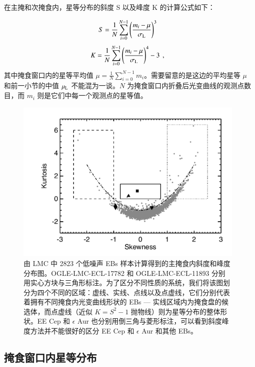 在主掩和次掩食内，星等分布的斜度 S 以及峰度 K 的计算公式如下：

\begin{equation} \label{eq:skew}
S =  \frac{1}{N} \sum_{i=0}^{N-1} \left(\frac{m_i - \mu}{\sigma_\mathrm{L}}\right)^3 
\end{equation} %
\begin{equation} \label{eq:kur}
K =  \frac{1}{N} \sum_{i=0}^{N-1} \left(\frac{m_i - \mu}{\sigma_\mathrm{L}}\right)^4 - 3 \, \ , 
\end{equation} %
其中掩食窗口内的星等平均值 $\mu = \frac{1}{N} \sum_{i=0}^{N-1} m_i$。需要留意的是这边的平均星等 
$\mu$ 和前一小节的中值 $\mu_\mathrm{L}$ 不能混为一谈。$N$ 为掩食窗口内折叠后光变曲线的观测点数
目，而 $m_i$ 则是它们中每一个观测点的星等值。


\begin{figure}[t]
\centering
\includegraphics[width=1.0\textwidth,trim={0.4in 0.2in 0 0}]{figures/chapter3/f5_lmcks.pdf}
\caption{由 LMC 中 2823 个低噪声 EBs 样本计算得到的主掩食内斜度和峰度分布图。OGLE-LMC-ECL-17782 和 OGLE-LMC-ECL-11893 分别用实心方块与三角形标注。为了区分不同性质的系统，我们将该图划分为四个不同的区域：虚线、实线、点线以及点虚线，它们分别代表着拥有不同掩食内光变曲线形状的 EBs --- 实线区域内为掩食盘的候选体，而点虚线（近似 $K=S^2-1$ 抛物线）则为星等分布的整体形状。EE Cep 和 $\epsilon$ Aur 也分别用倒三角与菱形标注，可以看到斜度峰度方法并不能很好的区分 EE Cep 和 $\epsilon$ Aur 和其他 EBs。}
\label{fig:lmcks}
\end{figure}


\subsection{掩食窗口内星等分布} \label{sec:discebresult}


